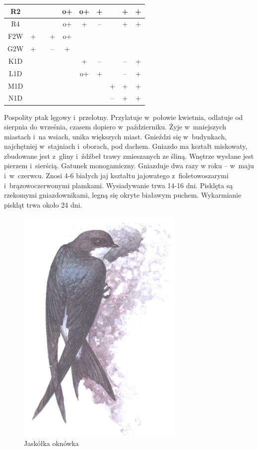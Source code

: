 \documentclass[a4paper,10pt]{report}
\begin{document}
\begin{longtable}{|c|c|c|c|c|c|c|c|c|c|}
R2 &  &  &  & o+ & o+ & + &  & + & + \\ \hline
R4 &  &  &  & o+ & + & -- &  & + & + \\ \hline
F2W & + &  & + & o+ &  &  &  &  &  \\ \hline
G2W & + &  & -- & + &  &  &  &  &  \\ \hline
K1D &  &  &  &  & + & -- &  & -- & + \\ \hline
L1D &  &  &  &  & o+ & + &  & -- & + \\ \hline
M1D &  &  &  &  &  &  & + & + & + \\ \hline
N1D &  &  &  &  &  &  & -- & + & + \\ \hline
\end{longtable}

Pospolity ptak lęgowy i~przelotny. Przylatuje w~połowie kwietnia, odlatuje od sierpnia do września, czasem dopiero w~październiku. Żyje w~mniejszych miastach i~na wsiach, unika większych miast. Gnieździ się w~budynkach, najchętniej w~stajniach i~oborach, pod dachem. Gniazdo ma kształt miskowaty, zbudowane jest z~gliny i~źdźbeł trawy zmieszanych ze śliną. Wnętrze wysłane jest pierzem i~sierścią. Gatunek monogamiczny. Gniazduje dwa razy w roku -- w~maju i~w~czerwcu. Znosi 4-6 białych jaj kształtu jajowatego z~fioletowoszarymi i~brązowoczerwonymi plamkami. Wysiadywanie trwa 14-16 dni. Pisklęta są rzekomymi gniazdownikami, legną się okryte białawym puchem. Wykarmianie piskląt trwa około 24 dni. 


\begin{figure}[ht]
\centerline{\includegraphics[scale=0.2]{jaskolka-oknowka}}
\caption{Jaskółka oknówka}
\label{fig:jaskolkaoknowka}
\end{figure}
\end{document}
